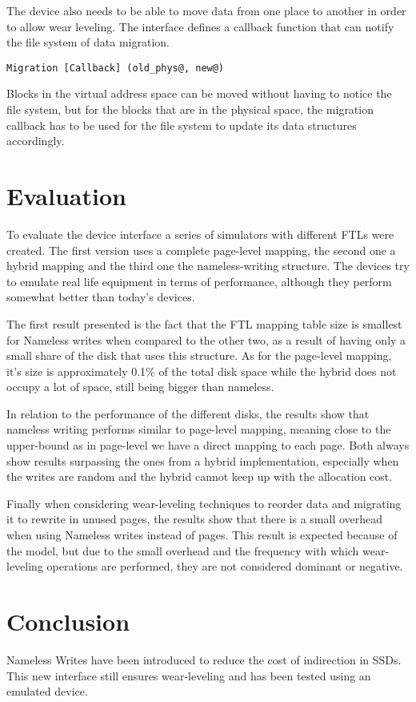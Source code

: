 \documentclass[twocolumn,a4paper,10pt]{article}
\begin{document}
The device also needs to be able to move data from one place to another in
order to allow wear leveling. The interface defines a callback function that
can notify the file system of data migration.
\begin{lstlisting}
Migration [Callback] (old_phys@, new@)
\end{lstlisting}
Blocks in the virtual address space can be moved without having to notice the
file system, but for the blocks that are in the physical space, the migration
callback has to be used for the file system to update its data structures
accordingly.

\section*{Evaluation}
To evaluate the device interface a series of simulators with different FTLs
were created. The first version uses a complete page-level mapping, the second
one a hybrid mapping and the third one the nameless-writing structure. The
devices try to emulate real life equipment in terms of performance, although
they perform somewhat better than today’s devices.

The first result presented is the fact that the FTL mapping table size is
smallest for Nameless writes when compared to the other two, as a result of
having only a small share of the disk that uses this structure. As for the
page-level mapping, it’s size is approximately 0.1\% of the total disk space
while the hybrid does not occupy a lot of space, still being bigger than
nameless.

In relation to the performance of the different disks, the results show that
nameless writing performs similar to page-level mapping, meaning close to the
upper-bound as in page-level we have a direct mapping to each page. Both
always show results surpassing the ones from a hybrid implementation,
especially when the writes are random and the hybrid cannot keep up with the
allocation cost.

Finally when considering wear-leveling techniques to reorder data and
migrating it to rewrite in unused pages, the results show that there is a
small overhead when using Nameless writes instead of pages. This result is
expected because of the model, but due to the small overhead and the frequency
with which wear-leveling operations are performed, they are not considered
dominant or negative.

\section*{Conclusion}
Nameless Writes have been introduced to reduce the cost of indirection in
SSDs. This new interface still ensures wear-leveling and has been tested using
an emulated device.
\end{document}
